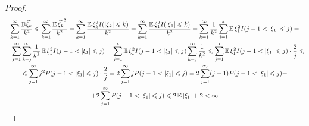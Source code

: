 \begin{proof}
\begin{multline*}
\sum_{k = 1}^{\infty} \frac{{\mathbb{D}} \widetilde{\xi_k}}{k^2} \leqslant
\sum_{k = 1}^{\infty} \frac{\operatorname{\mathbb{E}} \widetilde{\xi_k}^2}{k^2} = 
\sum_{k = 1}^{\infty} \frac{\operatorname{\mathbb{E}} \xi_k^2 I(|\xi_k| \leqslant k)}{k^2} = 
\sum_{k = 1}^{\infty} \frac{\operatorname{\mathbb{E}} \xi_1^2 I(|\xi_1| \leqslant k)}{k^2} = 
\sum_{k = 1}^{\infty} \frac{1}{k^2} \sum_{j = 1}^k 
\operatorname{\mathbb{E}} \xi_1^2 I(j - 1 < |\xi_1| \leqslant j) = \\
= \sum_{j = 1}^{\infty} \sum_{k = j}^{\infty} \frac{1}{k^2}
\operatorname{\mathbb{E}} \xi_1^2 I(j - 1 < |\xi_1| \leqslant j) = 
\sum_{j = 1}^{\infty} \operatorname{\mathbb{E}} \xi_1^2 I(j - 1 < |\xi_1| \leqslant j)
\sum_{k = j}^{\infty} \frac{1}{k^2} \leqslant
\sum_{j = 1}^{\infty} \operatorname{\mathbb{E}} \xi_1^2 I(j - 1 < |\xi_1| \leqslant j) \cdot
\frac{2}{j} \leqslant \\
\leqslant \sum_{j = 1}^{\infty} j^2 P(j - 1 < |\xi_1| \leqslant j) \cdot
\frac{2}{j} = 
2 \sum_{j = 1}^{\infty} j P(j - 1 < |\xi_1| \leqslant j) = 
2 \sum_{j = 1}^{\infty} (j - 1) P(j - 1 < |\xi_1| \leqslant j) + \\
+ 2 \sum_{j = 1}^{\infty} P(j - 1 < |\xi_1| \leqslant j) \leqslant
2 \operatorname{\mathbb{E}} |\xi_1| + 2 < \infty
\end{multline*}

\end{proof}